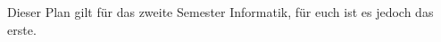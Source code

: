 \begin{center}
\end{center}
\noindent Dieser Plan gilt für das zweite Semester Informatik, für euch ist es jedoch das erste.\\

